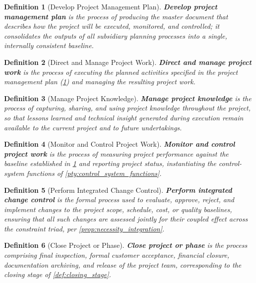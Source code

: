 \documentclass[12pt, a4paper]{report}
\theoremstyle{engnotes}
\newtheorem{defn}{Definition}[section]
\begin{document}
\begin{defn}[Develop Project Management Plan]\label{def:develop_pm_plan}
    \textbf{Develop project management plan} is the process of producing the master document that describes how the project will be executed, monitored, and controlled; it consolidates the outputs of all subsidiary planning processes into a single, internally consistent baseline.
\end{defn}

\begin{defn}[Direct and Manage Project Work]\label{def:direct_manage_work}
    \textbf{Direct and manage project work} is the process of executing the planned activities specified in the project management plan (\cref{def:develop_pm_plan}) and managing the resulting project work.
\end{defn}

\begin{defn}[Manage Project Knowledge]\label{def:manage_project_knowledge}
    \textbf{Manage project knowledge} is the process of capturing, sharing, and using project knowledge throughout the project, so that lessons learned and technical insight generated during execution remain available to the current project and to future undertakings.
\end{defn}

\begin{defn}[Monitor and Control Project Work]\label{def:monitor_control_work}
    \textbf{Monitor and control project work} is the process of measuring project performance against the baseline established in \cref{def:develop_pm_plan} and reporting project status, instantiating the control-system functions of \cref{pty:control_system_functions}.
\end{defn}

\begin{defn}[Perform Integrated Change Control]\label{def:integrated_change_control}
    \textbf{Perform integrated change control} is the formal process used to evaluate, approve, reject, and implement changes to the project scope, schedule, cost, or quality baselines, ensuring that all such changes are assessed jointly for their coupled effect across the constraint triad, per \cref{prop:necessity_integration}.
\end{defn}

\begin{defn}[Close Project or Phase]\label{def:close_project_phase}
    \textbf{Close project or phase} is the process comprising final inspection, formal customer acceptance, financial closure, documentation archiving, and release of the project team, corresponding to the closing stage of \cref{def:closing_stage}.
\end{defn}
\end{document}
